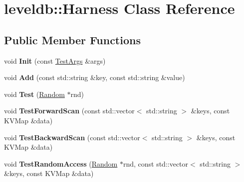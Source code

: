 \hypertarget{classleveldb_1_1_harness}{}\section{leveldb\+::Harness Class Reference}
\label{classleveldb_1_1_harness}
\subsection*{Public Member Functions}
\begin{DoxyCompactItemize}
\item 
\mbox{\label{classleveldb_1_1_harness_a2aba24255691eaad2a57ee43cbc9ddc1}} 
void {\bfseries Init} (const \mbox{\hyperlink{structleveldb_1_1_test_args}{Test\+Args}} \&args)
\item 
\mbox{\label{classleveldb_1_1_harness_a019ddc8e52dc5cfaac85f53993ab1ed4}} 
void {\bfseries Add} (const std\+::string \&key, const std\+::string \&value)
\item 
\mbox{\label{classleveldb_1_1_harness_a78dbb5352b51e22bbc449bad7c1a9176}} 
void {\bfseries Test} (\mbox{\hyperlink{classleveldb_1_1_random}{Random}} $\ast$rnd)
\item 
\mbox{\label{classleveldb_1_1_harness_ac5ff108406a08a6e3e22318246d206ef}} 
void {\bfseries Test\+Forward\+Scan} (const std\+::vector$<$ std\+::string $>$ \&keys, const K\+V\+Map \&data)
\item 
\mbox{\label{classleveldb_1_1_harness_aba7a2c48101cd9d024be64080ebed363}} 
void {\bfseries Test\+Backward\+Scan} (const std\+::vector$<$ std\+::string $>$ \&keys, const K\+V\+Map \&data)
\item 
\mbox{\label{classleveldb_1_1_harness_adb4b24bd89b600a67b0cd52ff64af9cd}} 
void {\bfseries Test\+Random\+Access} (\mbox{\hyperlink{classleveldb_1_1_random}{Random}} $\ast$rnd, const std\+::vector$<$ std\+::string $>$ \&keys, const K\+V\+Map \&data)
\item 
\mbox{\label{classleveldb_1_1_harness_a69962f92cdd4fdc5d1f91d8c3cbebb3f}} 

\end{DoxyCompactItemize}
